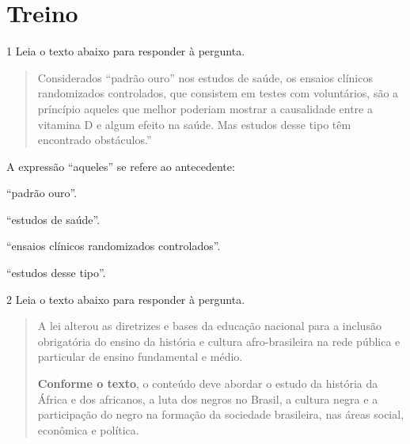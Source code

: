 \section{Treino}

\num{1} Leia o texto abaixo para responder à pergunta.

\begin{quote}

Considerados ``padrão ouro'' nos estudos de saúde, os ensaios clínicos
randomizados controlados, que consistem em testes com voluntários, são a
príncípio aqueles que melhor poderiam mostrar a causalidade entre a
vitamina D e algum efeito na saúde. Mas estudos desse tipo têm
encontrado obstáculos.''

\end{quote}


A expressão ``aqueles'' se refere ao antecedente:

\begin{escolha}

  \item ``padrão ouro''.
  
  \item ``estudos de saúde''.
  
  \item ``ensaios clínicos randomizados controlados''.
  
  \item ``estudos desse tipo''. 

\end{escolha}


\num{2} Leia o texto abaixo para responder à pergunta.

\begin{quote}

A lei alterou as diretrizes e bases da educação nacional para a
inclusão obrigatória do ensino da história e cultura afro-brasileira na
rede pública e particular de ensino fundamental e médio.

\textbf{Conforme o texto}, o conteúdo deve abordar o estudo da história
da África e dos africanos, a luta dos negros no Brasil, a cultura negra
e a participação do negro na formação da sociedade brasileira, nas áreas
social, econômica e política.

\end{quote}


